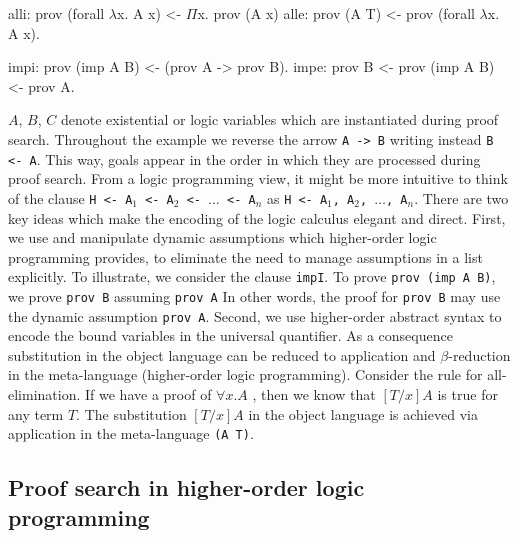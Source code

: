 \documentclass{llncs}
\newcommand{\z}{\mbox{}}
\begin{document}
\hspace{-0.65cm}
\begin{small}
\begin{minipage}[t]{5.5cm}
\begin{code}
alli: prov (forall $\lambda$x. A x)
      <- $\Pi$x. prov (A x)
alle: prov (A T)
      <- prov (forall $\lambda$x. A x).
 \end{code}
 \end{minipage}
\begin{minipage}[t]{5.5cm}
\begin{code}
impi: prov (imp A B)
      <- (prov A -> prov B).
impe: prov B
      <- prov (imp A B)
      <- prov A.
\end{code}
\end{minipage}
  
\end{small}


$A$, $B$, $C$ denote existential or logic variables which are
instantiated during proof search. Throughout the example we reverse
the arrow {\tt{A -> B}} writing instead {\tt{B <- A}}. This way, goals
appear in the order in which they are processed during proof
search. From a logic programming view, it might be more intuitive to
think of the clause {\tt{H <- A$_1$ <- A$_2$ <- $\ldots$ <- A$_n$}} as
{\tt{H <- A$_1$, A$_2$, $\ldots$, A$_n$}}. There are two key ideas
which make the encoding of the logic calculus elegant and direct.
First, we use and manipulate dynamic assumptions which higher-order
logic programming provides, to eliminate the need to manage
assumptions in a list explicitly. To illustrate, we consider the
clause {\tt impI}. To prove {\tt prov (imp A B)}, we prove {\tt prov
B} assuming {\tt prov A} In other words, the proof for {\tt prov B}
may use the dynamic assumption {\tt prov A}.  Second, we use
higher-order abstract syntax to encode the bound variables in the
universal quantifier. As a consequence substitution in the object
language can be reduced to application and $\beta$-reduction in the
meta-language (higher-order logic programming). Consider the rule for
all-elimination. If we have a proof of $\forall x.A$ , then we know
that $[T/x]A$ is true for any term $T$. The substitution $[T/x]A$ in
the object language is achieved via application in the meta-language
{\tt (A T)}.


\subsection{Proof search in higher-order logic programming}
\end{document}
